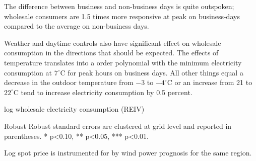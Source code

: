 The difference between business and non-business days is quite outspoken; wholesale consumers are 1.5 times more responsive at peak on business-days compared to the average on non-business days.
\par
Weather and daytime controls also have significant effect on wholesale consumption in the directions that should be expected. The effects of temperature translates into a  order polynomial with the minimum electricity consumption at $7^{\circ}$C for peak hours on business days. All other things equal a decrease in the outdoor temperature from $-3$ to $-4^{\circ}$C or an increase from 21 to $22^{\circ}$C tend to increase electricity consumption by 0.5 percent.
\begin{table}[H]
\begin{threeparttable}
  \centering
  \caption{log wholesale electricity consumption (REIV)}
  \footnotesize
        
    \begin{tablenotes}
    \item Robust Robust standard errors are clustered at grid level and reported in parentheses. * p<0.10, ** p<0.05, *** p<0.01.
    \item Log spot price is instrumented for by wind power prognosis for the same region.
     \end{tablenotes}
  \label{tab:ws_preferred}
\end{threeparttable}
\end{table}


